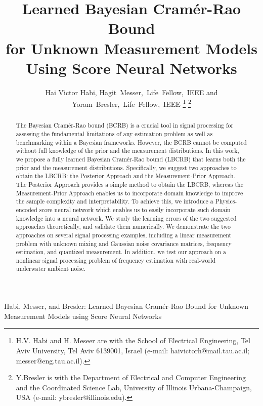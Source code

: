 \documentclass[journal,twoside,web]{ieeecolor}
\begin{document}


\title{Learned Bayesian Cram\'er-Rao Bound \\
for Unknown Measurement Models \\ {Using} Score Neural Networks}
\author{Hai Victor Habi, Hagit~Messer,~Life~Fellow,~IEEE and Yoram~Bresler,~Life~Fellow,~IEEE
\thanks{H.V. Habi and H. Meseer are with the School of Electrical Engineering, Tel Aviv University, Tel Aviv 6139001, Israel (e-mail: haivictorh@mail.tau.ac.il; messer@eng.tau.ac.il).}
\thanks{Y.Bresler is with the Department of Electrical and Computer Engineering and the Coordinated Science Lab, University of Illinois Urbana-Champaign, USA (e-mail: ybresler@illinois.edu).
}}
\date{}

%
{Habi, Messer, and Bresler: Learned Bayesian Cram\'er-Rao Bound for Unknown Measurement Models  using Score Neural Networks}

\maketitle

\begin{abstract}
    The Bayesian Cramér-Rao bound (BCRB) is a crucial tool in signal processing for assessing the fundamental limitations of any estimation problem as well as benchmarking within a Bayesian frameworks. However, the BCRB cannot be computed without full knowledge of the prior and the measurement distributions. In this work, we propose a fully learned Bayesian Cramér-Rao bound (LBCRB) that learns both the prior and the measurement distributions. Specifically, we suggest two approaches to obtain the LBCRB: the Posterior Approach and the Measurement-Prior Approach. The Posterior Approach provides a simple method to obtain the LBCRB, whereas the Measurement-Prior Approach enables us to incorporate domain knowledge to improve the sample complexity and {interpretability}. To achieve this, we introduce a Physics-encoded score neural network which enables us to easily incorporate such domain knowledge into a neural network. We {study the learning} errors of the two suggested approaches theoretically, and  validate them numerically. We demonstrate the two approaches on several signal processing examples, including a linear measurement problem with unknown mixing and Gaussian noise covariance matrices, frequency estimation, and quantized measurement. In addition, we test our approach on a nonlinear signal processing problem of frequency estimation with real-world underwater ambient noise.
\end{abstract}
\raggedbottom
\end{document}
